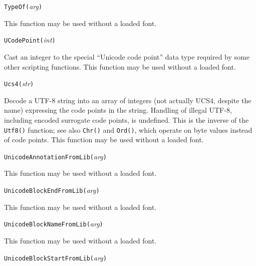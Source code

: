 

\texttt{TypeOf(}\textit{arg}\texttt{)}

This function may be used without a loaded font.



\texttt{UCodePoint(}\textit{int}\texttt{)}

Cast an integer to the special ``Unicode code point'' data type required by
some other scripting functions.  This function may be used without a loaded
font.



\texttt{Ucs4(}\textit{str}\texttt{)}

Decode a UTF-8 string into an array of integers (not actually UCS4, despite
the name) expressing the code points
in the string.  Handling of illegal UTF-8, including encoded surrogate code
points, is undefined.  This is the inverse of the \texttt{Utf8()} function;
see also \texttt{Chr()} and \texttt{Ord()}, which operate on byte values
instead of code points.  This function may be used without a loaded font.



\texttt{UnicodeAnnotationFromLib(}\textit{arg}\texttt{)}

This function may be used without a loaded font.



\texttt{UnicodeBlockEndFromLib(}\textit{arg}\texttt{)}

This function may be used without a loaded font.



\texttt{UnicodeBlockNameFromLib(}\textit{arg}\texttt{)}

This function may be used without a loaded font.



\texttt{UnicodeBlockStartFromLib(}\textit{arg}\texttt{)}

